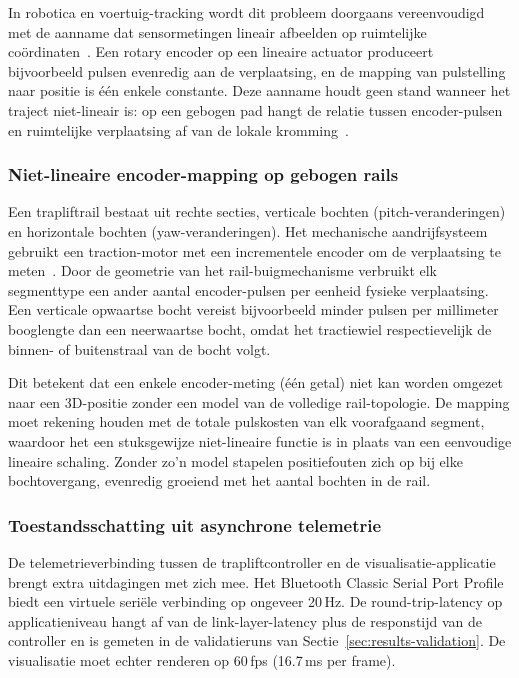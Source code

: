 \documentclass[10pt, a4paper, twocolumn]{article}
\begin{document}
In robotica en voertuig-tracking wordt dit probleem doorgaans vereenvoudigd met
de aanname dat sensormetingen lineair afbeelden op ruimtelijke
coördinaten~\cite{elmenreich2002sensorfusion}. Een rotary encoder op een
lineaire actuator produceert bijvoorbeeld pulsen evenredig aan de verplaatsing,
en de mapping van pulstelling naar positie is één enkele constante. Deze aanname
houdt geen stand wanneer het traject niet-lineair is: op een gebogen pad hangt
de relatie tussen encoder-pulsen en ruimtelijke verplaatsing af van de lokale
kromming~\cite{merry2010encoder}.

\subsubsection{Niet-lineaire encoder-mapping op gebogen rails}
Een trapliftrail bestaat uit rechte secties, verticale bochten
(pitch-veranderingen) en horizontale bochten (yaw-veranderingen). Het
mechanische aandrijfsysteem gebruikt een traction-motor met een incrementele
encoder om de verplaatsing te meten~\cite{bolton2019mechatronics}. Door de
geometrie van het rail-buigmechanisme verbruikt elk segmenttype een ander aantal
encoder-pulsen per eenheid fysieke verplaatsing. Een verticale opwaartse bocht
vereist bijvoorbeeld minder pulsen per millimeter booglengte dan een neerwaartse
bocht, omdat het tractiewiel respectievelijk de binnen- of buitenstraal van de
bocht volgt.

Dit betekent dat een enkele encoder-meting (één getal) niet kan worden omgezet naar
een 3D-positie zonder een model van de volledige rail-topologie. De mapping moet
rekening houden met de totale pulskosten van elk voorafgaand segment,
waardoor het een stuksgewijze niet-lineaire functie is in plaats van een
eenvoudige lineaire schaling. Zonder zo'n model stapelen positiefouten zich op
bij elke bochtovergang, evenredig groeiend met het aantal bochten in de rail.

\subsubsection{Toestandsschatting uit asynchrone telemetrie}
De telemetrieverbinding tussen de trapliftcontroller en de
visualisatie-applicatie brengt extra uitdagingen met zich mee. Het Bluetooth
Classic Serial Port Profile~\cite{bluetoothsig2022spp} biedt een virtuele
seriële verbinding op ongeveer 20\,Hz. De round-trip-latency op applicatieniveau
hangt af van de link-layer-latency plus de responstijd van de controller en is
gemeten in de validatieruns van Sectie~\ref{sec:results-validation}.
De visualisatie moet echter renderen op 60\,fps (16.7\,ms per frame).
\end{document}
